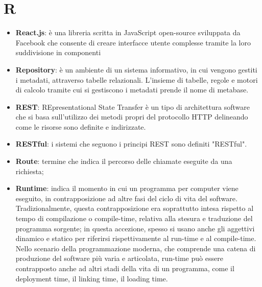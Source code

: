 \section{R}
\begin{itemize}
\item
\textbf{React.js}: è una libreria scritta in JavaScript open-source sviluppata da Facebook che consente di creare interfacce utente complesse tramite la loro suddivisione in componenti
\item
\textbf{Repository}: è un ambiente di un sistema informativo, in cui vengono gestiti i metadati, attraverso tabelle relazionali. L'insieme di tabelle, regole e motori di calcolo tramite cui si gestiscono i metadati prende il nome di metabase. 
\item
\textbf{REST}: REpresentational State Transfer è un tipo di architettura software che si basa sull'utilizzo dei metodi propri del protocollo HTTP delineando come le risorse sono definite e indirizzate.
\item
\textbf{RESTful}: i sistemi che seguono i principi REST sono definiti "RESTful".
\item
\textbf{Route}: termine che indica il percorso delle chiamate eseguite da una richiesta;
\item
\textbf{Runtime}: indica il momento in cui un programma per computer viene eseguito, in contrapposizione ad altre fasi del ciclo di vita del software.
Tradizionalmente, questa contrapposizione era soprattutto intesa rispetto al tempo di compilazione o compile-time, relativa alla stesura e traduzione del programma sorgente; in questa accezione, spesso si usano anche gli aggettivi dinamico e statico per riferirsi rispettivamente al run-time e al compile-time. Nello scenario della programmazione moderna, che comprende una catena di produzione del software più varia e articolata, run-time può essere contrapposto anche ad altri stadi della vita di un programma, come il deployment time, il linking time, il loading time.
\end{itemize}